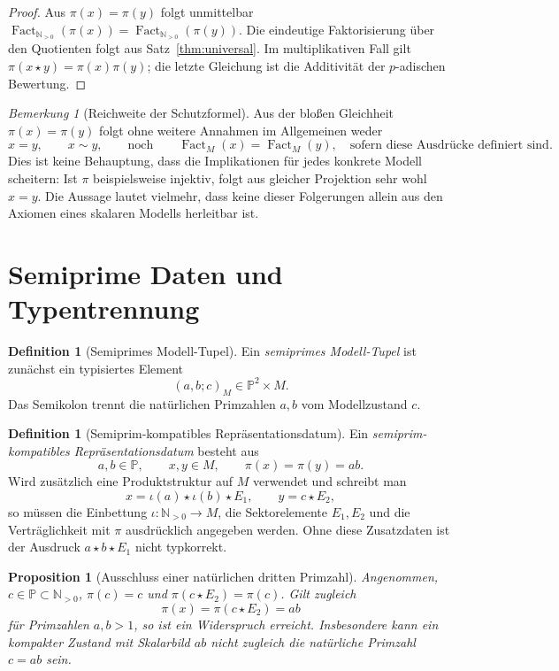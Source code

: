 \documentclass[11pt,a4paper,reqno]{amsart}
\newtheorem{proposition}[theorem]{Proposition}
\theoremstyle{definition}
\newtheorem{definition}[theorem]{Definition}
\theoremstyle{remark}
\newtheorem{remark}[theorem]{Bemerkung}
\newcommand{\Npos}{\mathbb{N}_{>0}}
\newcommand{\Pset}{\mathbb{P}}
\newcommand{\Fact}{\operatorname{Fact}}
\begin{document}
\begin{proof}
Aus $\pi(x)=\pi(y)$ folgt unmittelbar
$\Fact_{\Npos}(\pi(x))=\Fact_{\Npos}(\pi(y))$. Die eindeutige Faktorisierung über den Quotienten folgt aus Satz~\ref{thm:universal}. Im multiplikativen Fall gilt
$\pi(x\star y)=\pi(x)\pi(y)$; die letzte Gleichung ist die Additivität der $p$-adischen Bewertung.
\end{proof}

\begin{remark}[Reichweite der Schutzformel]
Aus der bloßen Gleichheit $\pi(x)=\pi(y)$ folgt ohne weitere Annahmen im Allgemeinen weder
\[
  x=y,
  \qquad x\sim y,
  \qquad\text{noch}\qquad
  \Fact_M(x)=\Fact_M(y),\quad\text{sofern diese Ausdrücke definiert sind}.
\]
Dies ist keine Behauptung, dass die Implikationen für jedes konkrete Modell scheitern: Ist $\pi$ beispielsweise injektiv, folgt aus gleicher Projektion sehr wohl $x=y$. Die Aussage lautet vielmehr, dass keine dieser Folgerungen allein aus den Axiomen eines skalaren Modells herleitbar ist.
\end{remark}

\section{Semiprime Daten und Typentrennung}

\begin{definition}[Semiprimes Modell-Tupel]
Ein \emph{semiprimes Modell-Tupel} ist zunächst ein typisiertes Element
\[
  (a,b;c)_M\in\Pset^2\times M.
\]
Das Semikolon trennt die natürlichen Primzahlen $a,b$ vom Modellzustand $c$.
\end{definition}

\begin{definition}[Semiprim-kompatibles Repräsentationsdatum]
Ein \emph{semiprim-kompatibles Repräsentationsdatum} besteht aus
\[
  a,b\in\Pset,
  \qquad x,y\in M,
  \qquad \pi(x)=\pi(y)=ab.
\]
Wird zusätzlich eine Produktstruktur auf $M$ verwendet und schreibt man
\[
  x=\iota(a)\star\iota(b)\star E_1,
  \qquad y=c\star E_2,
\]
so müssen die Einbettung $\iota\colon\Npos\to M$, die Sektorelemente $E_1,E_2$ und die Verträglichkeit mit $\pi$ ausdrücklich angegeben werden. Ohne diese Zusatzdaten ist der Ausdruck $a\star b\star E_1$ nicht typkorrekt.
\end{definition}

\begin{proposition}[Ausschluss einer natürlichen dritten Primzahl]
Angenommen, $c\in\Pset\subset\Npos$, $\pi(c)=c$ und $\pi(c\star E_2)=\pi(c)$. Gilt zugleich
\[
  \pi(x)=\pi(c\star E_2)=ab
\]
für Primzahlen $a,b>1$, so ist ein Widerspruch erreicht. Insbesondere kann ein kompakter Zustand mit Skalarbild $ab$ nicht zugleich die natürliche Primzahl $c=ab$ sein.
\end{proposition}
\end{document}
